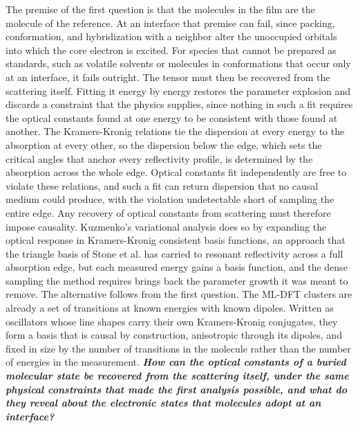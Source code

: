 The premise of the first question is that the molecules in the film are the molecule of the reference. At an interface that premise can fail, since packing, conformation, and hybridization with a neighbor alter the unoccupied orbitals into which the core electron is excited. For species that cannot be prepared as standards, such as volatile solvents or molecules in conformations that occur only at an interface, it fails outright. The tensor must then be recovered from the scattering itself. Fitting it energy by energy restores the parameter explosion and discards a constraint that the physics supplies, since nothing in such a fit requires the optical constants found at one energy to be consistent with those found at another. The Kramers-Kronig relations tie the dispersion at every energy to the absorption at every other, so the dispersion below the edge, which sets the critical angles that anchor every reflectivity profile, is determined by the absorption across the whole edge. Optical constants fit independently are free to violate these relations, and such a fit can return dispersion that no causal medium could produce, with the violation undetectable short of sampling the entire edge. Any recovery of optical constants from scattering must therefore impose causality. Kuzmenko's variational analysis does so by expanding the optical response in Kramers-Kronig consistent basis functions, an approach that the triangle basis of Stone et al. has carried to resonant reflectivity across a full absorption edge, but each measured energy gains a basis function, and the dense sampling the method requires brings back the parameter growth it was meant to remove. The alternative follows from the first question. The ML-DFT clusters are already a set of transitions at known energies with known dipoles. Written as oscillators whose line shapes carry their own Kramers-Kronig conjugates, they form a basis that is causal by construction, anisotropic through its dipoles, and fixed in size by the number of transitions in the molecule rather than the number of energies in the measurement. \emph{\textbf{How can the optical constants of a buried molecular state be recovered from the scattering itself, under the same physical constraints that made the first analysis possible, and what do they reveal about the electronic states that molecules adopt at an interface?}}

